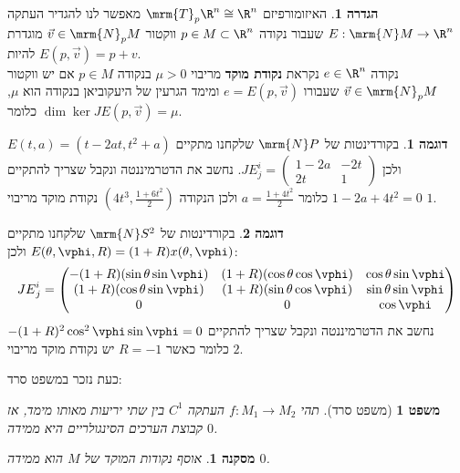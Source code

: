\documentclass{article}
\newtheorem{corollary}{מסקנה}
\newtheorem*{theorem*}{משפט}
\theoremstyle{definition}
\newtheorem*{definition*}{הגדרה}
\newtheorem*{example*}{דוגמה}
\begin{document}
	\begin{definition*}
		האיזומורפיזם
		\(\mrm{T}_p \R^n \cong \R^n\)
		מאפשר לנו להגדיר העתקה
		\(E:\mrm{N} M \to \R^n\)
		שעבור נקודה
		\(p \in M \subset \R^n\)
		ווקטור
		\(\vec{v} \in \mrm{N}_p M\)
		מוגדרת להיות
		\(E(p,\vec{v})=p+v\).
		\\
		נקודה
		\(e \in \R^n\)
		נקראת \textbf{נקודת מוקד} מריבוי
		\(\mu>0\)
		בנקודה
		\(p \in M\)
		אם יש ווקטור
		\(\vec{v} \in \mrm{N}_p M\)
		שעבורו
		\(e = E(p,\vec{v})\)
		ומימד הגרעין של היעקוביאן בנקודה הוא \(\mu\), כלומר
		\(\dim \ker JE(p,\vec{v}) = \mu\).
	\end{definition*}

	\begin{example*}
		בקורדינטות של
		\(\mrm{N} P\)
		שלקחנו מתקיים
		\(
			E(t,a) = (t-2at,t^2+a)
		\)
		ולכן
		\(
			{JE}^i_j = \begin{pmatrix}
				1-2a & -2t
				\\
				2t & 1
			\end{pmatrix}
		\).
		נחשב את הדטרמיננטה ונקבל שצריך להתקיים
		\(1-2a+4t^2=0\)
		כלומר
		\(a=\frac{1+4t^2}{2}\)
		ולכן הנקודה
		\(\left(4t^3,\frac{1+6t^2}{2}\right)\)
		נקודת מוקד מריבוי \(1\).
	\end{example*}

	\begin{example*}
		בקורדינטות של
		\(\mrm{N} S^2\)
		שלקחנו מתקיים
		\(
		E(\theta,\vphi,R) = (1+R)x(\theta,\vphi)
		\)
		ולכן:
		\[
			{JE}^i_j = \begin{pmatrix}
				-(1+R)(\sin\theta \sin\vphi) & (1+R)(\cos\theta \cos\vphi) & \cos\theta \sin\vphi
				\\
				(1+R)(\cos\theta \sin\vphi) & (1+R)(\sin\theta \cos\vphi) & \sin\theta \sin\vphi
				\\
				0 & 0 & \cos \vphi
			\end{pmatrix}
		\]
		נחשב את הדטרמיננטה ונקבל שצריך להתקיים
		\(-(1+R)^2 \cos^2\vphi \sin\vphi=0\)
		כלומר כאשר
		\(R=-1\)
		יש נקודת מוקד מריבוי \(2\).
	\end{example*}

	כעת נזכר במשפט סרד:
	\begin{theorem*}[משפט סרד]
		תהי
		\(f:M_1\to M_2\)
		העתקה
		\(C^1\)
		בין שתי יריעות מאותו מימד,
		אז קבוצת הערכים הסינגולריים היא ממידה \(0\).
	\end{theorem*}

	\begin{corollary}
		אוסף נקודות המוקד של \(M\) הוא ממידה \(0\).
	\end{corollary}
\end{document}
